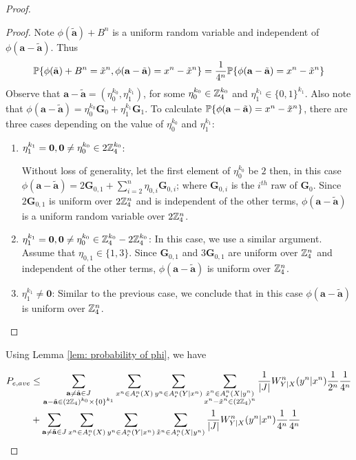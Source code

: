 \documentclass[conference]{IEEEtran}
\theoremstyle{plain}
\theoremstyle{definition}
\theoremstyle{remark}
\begin{document}
\begin{proof}
\begin{proof}
Note $\phi(\tilde{\mathbf{a}})+B^n$ is a uniform random variable and independent of  $\phi(\mathbf{a}-\tilde{\mathbf{a}})$. Thus
\begin{align*}
\mathbb{P}\{ \phi(\tilde{\mathbf{a}})+B^n=\tilde{x}^n, \phi(\mathbf{a}-\tilde{\mathbf{a}})=x^n-\tilde{x}^n\}=\frac{1}{4^n} \mathbb{P}\{\phi(\mathbf{a}-\tilde{\mathbf{a}})=x^n-\tilde{x}^n\}
\end{align*}
Observe that $\mathbf{a}-\tilde{\mathbf{a}}=(\eta_0^{k_0},\eta_1^{k_1})$, for some $\eta_0^{k_0} \in \mathbb{Z}_4^{k_0}$ and $\eta_1^{k_1}\in \{0,1\}^{k_1}$. Also note that $\phi(\mathbf{a}-\tilde{\mathbf{a}})=\eta_0^{k_0}\mathbf{G}_0+\eta_1^{k_1}\mathbf{G}_1$. To calculate $\mathbb{P}\{\phi(\mathbf{a}-\tilde{\mathbf{a}})=x^n-\tilde{x}^n\}$,  there are three cases depending on the value of $\eta_0^{k_0}$ and $\eta_1^{k_1}$:

\begin{enumerate}
\item $\eta_1^{k_1}=\mathbf{0}, \mathbf{0} \neq \eta_0^{k_0}\in 2\mathbb{Z}_4^{k_0}$:

 Without loss of generality, let the first element of $\eta_0^{k_0}$ be $2$ then, in this case  $\phi(\mathbf{a}-\tilde{\mathbf{a}})=2\mathbf{G}_{0,1}+\sum_{i=2}^n \eta_{0,i}\mathbf{G}_{0,i}$; where $\mathbf{G}_{0,i}$ is the $i^{th}$ raw of $\mathbf{G}_0$. Since $2\mathbf{G}_{0,1}$ is uniform over $2\mathbb{Z}_4^n$ and is independent of the other terms, $\phi(\mathbf{a}-\tilde{\mathbf{a}})$ is a uniform random variable over $2\mathbb{Z}_4^n$.

\item $\eta_1^{k_1}=\mathbf{0}, \mathbf{0} \neq \eta_0^{k_0}\in \mathbb{Z}_4^{k_0}-2\mathbb{Z}_4^{k_0}$:
In this case, we use a similar argument. Assume that $\eta_{0,1}\in \{1,3\}$. Since $\mathbf{G}_{0,1}$ and $3\mathbf{G}_{0,1}$ are uniform over $\mathbb{Z}_4^n$ and independent of the other terms,  $\phi(\mathbf{a}-\tilde{\mathbf{a}})$ is uniform over $\mathbb{Z}_4^n$.

\item $\eta_1^{k_1}\neq \mathbf{0}$:
Similar to the previous case, we conclude that in this case $\phi(\mathbf{a}-\tilde{\mathbf{a}})$ is uniform over $\mathbb{Z}_4^n$.
\end{enumerate}

\end{proof}

Using Lemma \ref{lem: probability of phi}, we have

\begin{align} \label{equ: p_err simple}
P_{e, ave} &\leq \sum_{\substack{\mathbf{a}\neq \tilde{\mathbf{a}} \in J \\\mathbf{a}-\tilde{\mathbf{a}} \in (2\mathbb{Z}_4)^{k_0}\times \{0\}^{k_1}} } \sum_{x^n\in A_\epsilon^n(X)} \sum_{y^n\in A_\epsilon^n(Y|x^n)} \sum_{\substack{\tilde{x}^n\in A_\epsilon^n(X|y^n)\\ x^n-\tilde{x}^n \in (2\mathbb{Z}_4)^n}} \frac{1}{|J|} W_{Y|X}^n(y^n|x^n) \frac{1}{2^n}\frac{1}{4^n}\\\nonumber
&+\sum_{\mathbf{a}\neq \tilde{\mathbf{a}} \in J }  \sum_{x^n\in A_\epsilon^n(X)} \sum_{y^n\in A_\epsilon^n(Y|x^n)} \sum_{\tilde{x}^n\in A_\epsilon^n(X|y^n)} \frac{1}{|J|} W_{Y|X}^n(y^n|x^n) \frac{1}{4^n}\frac{1}{4^n}
\end{align}


\end{proof}
\end{document}
